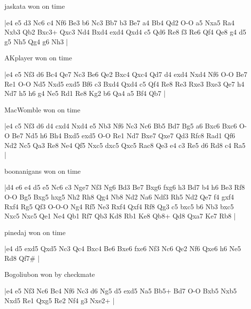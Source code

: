 \showboard

jaskata won on time

\makegametitle
|e4 e5 d3 Nc6 c4 Nf6 Be3 b6 Nc3 Bb7 b3 Be7 a4 Bb4 Qd2 O-O a5 Nxa5 Ra4 Nxb3 Qb2 Bxc3+ Qxc3 Nd4 Bxd4 exd4 Qxd4 c5 Qd6 Re8 f3 Re6 Qf4 Qe8 g4 d5 g5 Nh5 Qg4 g6 Nh3  |

\showboard

AKplayer won on time

\makegametitle
|e4 e5 Nf3 d6 Bc4 Qe7 Nc3 Be6 Qe2 Bxc4 Qxc4 Qd7 d4 exd4 Nxd4 Nf6 O-O Be7 Re1 O-O Nd5 Nxd5 exd5 Bf6 c3 Bxd4 Qxd4 c5 Qf4 Re8 Re3 Rxe3 Bxe3 Qe7 h4 Nd7 h5 h6 g4 Ne5 Rd1 Re8 Kg2 b6 Qa4 a5 Bf4 Qb7  |

\showboard

MacWomble won on time

\makegametitle
|e4 c5 Nf3 d6 d4 cxd4 Nxd4 e5 Nb3 Nf6 Nc3 Nc6 Bb5 Bd7 Bg5 a6 Bxc6 Bxc6 O-O Be7 Nd5 h6 Bh4 Bxd5 exd5 O-O Re1 Nd7 Bxe7 Qxe7 Qd3 Rfc8 Rad1 Qf6 Nd2 Nc5 Qa3 Re8 Ne4 Qf5 Nxc5 dxc5 Qxc5 Rac8 Qe3 e4 c3 Re5 d6 Rd8 c4 Ra5  |

\showboard

boonanigans won on time

\makegametitle
|d4 e6 e4 d5 e5 Nc6 c3 Nge7 Nf3 Ng6 Bd3 Be7 Bxg6 fxg6 h3 Bd7 b4 h6 Be3 Rf8 O-O Bg5 Bxg5 hxg5 Nh2 Rh8 Qg4 Nb8 Nd2 Na6 Ndf3 Rh5 Nd2 Qe7 f4 gxf4 Rxf4 Rg5 Qf3 O-O-O Ng4 Rf5 Ne3 Rxf4 Qxf4 Rf8 Qg3 c5 bxc5 b6 Nb3 bxc5 Nxc5 Nxc5 Qe1 Ne4 Qb1 Rf7 Qb3 Kd8 Rb1 Ke8 Qb8+ Qd8 Qxa7 Ke7 Rb8  |

\showboard

pinedaj won on time

\makegametitle
|e4 d5 exd5 Qxd5 Nc3 Qc4 Bxc4 Be6 Bxe6 fxe6 Nf3 Nc6 Qe2 Nf6 Qxe6 h6 Ne5 Rd8 Qf7\#  |

\showboard

Bogoliubon won by checkmate

\makegametitle
|e4 e5 Nf3 Nc6 Bc4 Nf6 Nc3 d6 Ng5 d5 exd5 Na5 Bb5+ Bd7 O-O Bxb5 Nxb5 Nxd5 Re1 Qxg5 Re2 Nf4 g3 Nxe2+  |

\showboard


